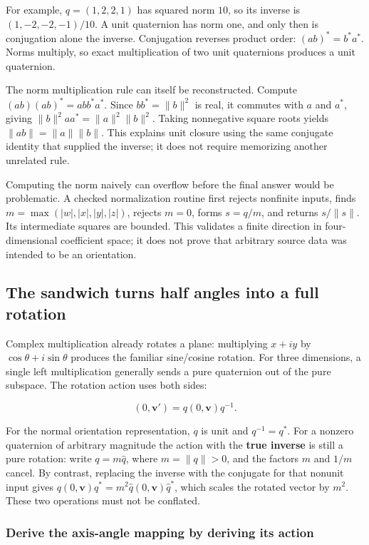 For example, \(q=(1,2,2,1)\) has squared norm \(10\), so its inverse is \((1,-2,-2,-1)/10\). A unit quaternion has norm one, and only then is conjugation alone the inverse. Conjugation reverses product order: \((ab)^*=b^*a^*\). Norms multiply, so exact multiplication of two unit quaternions produces a unit quaternion.

The norm multiplication rule can itself be reconstructed. Compute \((ab)(ab)^*=abb^*a^*\). Since \(bb^*=\|b\|^2\) is real, it commutes with \(a\) and \(a^*\), giving \(\|b\|^2aa^*=\|a\|^2\|b\|^2\). Taking nonnegative square roots yields \(\|ab\|=\|a\|\|b\|\). This explains unit closure using the same conjugate identity that supplied the inverse; it does not require memorizing another unrelated rule.

Computing the norm naively can overflow before the final answer would be problematic. A checked normalization routine first rejects nonfinite inputs, finds \(m=\max(|w|,|x|,|y|,|z|)\), rejects \(m=0\), forms \(s=q/m\), and returns \(s/\|s\|\). Its intermediate squares are bounded. This validates a finite direction in four-dimensional coefficient space; it does not prove that arbitrary source data was intended to be an orientation.

\subsection{The sandwich turns half angles into a full rotation}\label{the-sandwich-turns-half-angles-into-a-full-rotation}

Complex multiplication already rotates a plane: multiplying \(x+iy\) by \(\cos\theta+i\sin\theta\) produces the familiar sine/cosine rotation. For three dimensions, a single left multiplication generally sends a pure quaternion out of the pure subspace. The rotation action uses both sides:

\[
(0,\mathbf v')=q(0,\mathbf v)q^{-1}.
\]

For the normal orientation representation, \(q\) is unit and \(q^{-1}=q^*\). For a nonzero quaternion of arbitrary magnitude the action with the \textbf{true inverse} is still a pure rotation: write \(q=m\widehat q\), where \(m=\|q\|>0\), and the factors \(m\) and \(1/m\) cancel. By contrast, replacing the inverse with the conjugate for that nonunit input gives \(q(0,\mathbf v)q^*=m^2\widehat q(0,\mathbf v)\widehat q^*\), which scales the rotated vector by \(m^2\). These two operations must not be conflated.

\subsubsection{Derive the axis-angle mapping by deriving its action}\label{derive-the-axis-angle-mapping-by-deriving-its-action}

